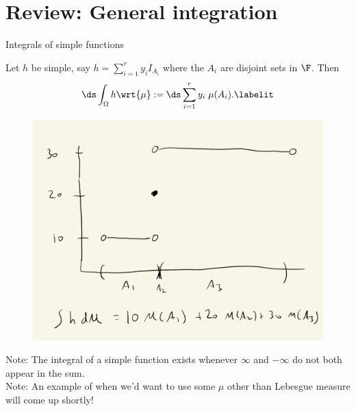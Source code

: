 \documentclass[10pt]{beamer}
\begin{document}
\section{Review: General integration}
\begin{frame}{Integrals of simple functions}

\begin{definition}
Let $h$ be simple, say $h = \sum_{i=1}^r y_i I_{A_i}$ where the $A_i$ are disjoint sets in $\F$.  Then
\begin{align*}
\ds\int_{\Omega} h \wrt{\mu} := \ds\sum_{i=1}^r y_i \; \mu(A_i).
\labelit \label{eqn:integral_of_simple_function}	
\end{align*}
 \label{def:integral_of_simple_function}
\end{definition}

\begin{figure}[H]
\centering 
\includegraphics[width=.4\textwidth]{images/integral_of_simple_function}	
\end{figure}	

{\tiny Note: The integral of a simple function exists whenever $\infty$ and  $-\infty$ do not both appear in the sum. } \\
\pause 
{\tiny Note: An example of when we'd want to use some $\mu$ other than Lebesgue measure will come up shortly!} 
\end{frame}
\end{document}
